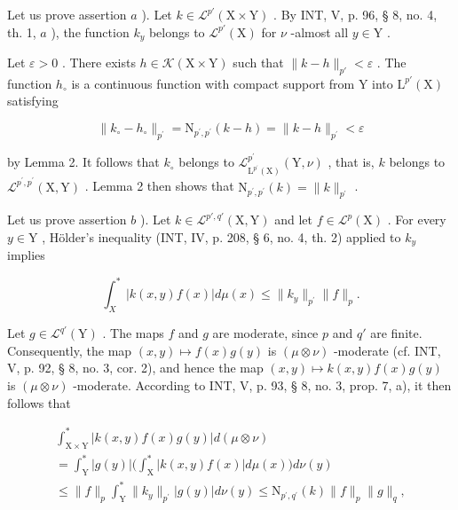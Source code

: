 Let us prove assertion \(a\) ). Let \(k \in \mathcal{L}^{p'}(\mathrm{X} \times \mathrm{Y})\) . By INT, V, p. 96, § 8, no. 4, th. 1, \(a\) ), the function \(k_y\) belongs to \(\mathcal{L}^{p'}(\mathrm{X})\) for \(\nu\) -almost all \(y \in \mathrm{Y}\) .

Let \(\varepsilon > 0\) . There exists \(h \in \mathcal{K}(\mathrm{X} \times \mathrm{Y})\) such that \(\|k - h\|_{p'} < \varepsilon\) . The function \(h_{\circ}\) is a continuous function with compact support from Y into \(\mathrm{L}^{p'}(\mathrm{X})\) satisfying

\[
\| k _ {\circ} - h _ {\circ} \| _ {p ^ {\prime}} = \mathrm{N} _ {p ^ {\prime}, p ^ {\prime}} (k - h) = \| k - h \| _ {p ^ {\prime}} <   \varepsilon
\]

by Lemma 2. It follows that \(k_{\circ}\) belongs to \(\mathcal{L}_{\mathrm{L}^{p^{\prime}}(\mathrm{X})}^{p^{\prime}}(\mathrm{Y},\nu)\) , that is, \(k\) belongs to \(\mathcal{L}^{p^{\prime},p^{\prime}}(\mathrm{X},\mathrm{Y})\) . Lemma 2 then shows that \(\mathrm{N}_{p^{\prime},p^{\prime}}(k)=\|k\|_{p^{\prime}}\) .

Let us prove assertion \(b\) ). Let \(k \in \mathcal{L}^{p', q'}(\mathrm{X}, \mathrm{Y})\) and let \(f \in \mathcal{L}^p(\mathrm{X})\) . For every \(y \in \mathrm{Y}\) , Hölder's inequality (INT, IV, p. 208, § 6, no. 4, th. 2) applied to \(k_y\) implies

\[
\int_ {X} ^ {*} | k (x, y) f (x) | d \mu (x) \leqslant \| k _ {y} \| _ {p ^ {\prime}} \| f \| _ {p}.
\]

Let \(g \in \mathcal{L}^{q'}(\mathrm{Y})\) . The maps \(f\) and \(g\) are moderate, since \(p\) and \(q'\) are finite. Consequently, the map \((x,y) \mapsto f(x)g(y)\) is \((\mu \otimes \nu)\) -moderate (cf. INT, V, p. 92, § 8, no. 3, cor. 2), and hence the map \((x,y)\mapsto k(x,y)f(x)g(y)\) is \((\mu\otimes\nu)\) -moderate. According to INT, V, p. 93, § 8, no. 3, prop. 7, a), it then follows that

\[
\begin{array}{l} \int_ {\mathrm{X} \times \mathrm{Y}} ^ {*} | k (x, y) f (x) g (y) | d (\mu \otimes \nu) \\ = \int_ {\mathrm{Y}} ^ {*} | g (y) | \Big (\int_ {\mathrm{X}} ^ {*} | k (x, y) f (x) | d \mu (x) \Big) d \nu (y) \\ \leqslant \| f \| _ {p} \int_ {\mathrm{Y}} ^ {*} \| k _ {y} \| _ {p ^ {\prime}} | g (y) | d \nu (y) \leqslant \mathrm{N} _ {p ^ {\prime}, q ^ {\prime}} (k) \| f \| _ {p} \| g \| _ {q}, \end{array}
\]

